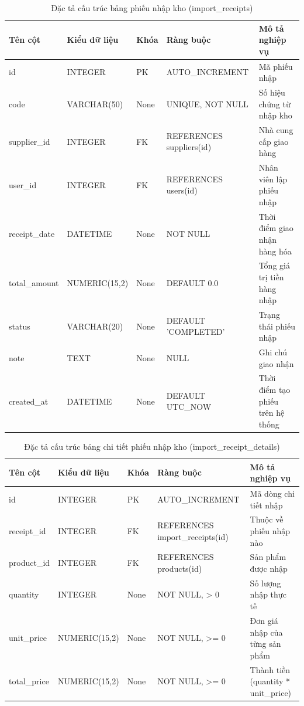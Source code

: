 \begin{table}[h!]
\centering
\caption{Đặc tả cấu trúc bảng phiếu nhập kho (import_receipts)}
\begin{tabular}{|l|l|l|l|l|}
\hline
\rowcolor{tablehead}
\textbf{Tên cột} & \textbf{Kiểu dữ liệu} & \textbf{Khóa} & \textbf{Ràng buộc} & \textbf{Mô tả nghiệp vụ} \\ \hline
id & INTEGER & PK & AUTO\_INCREMENT & Mã phiếu nhập \\ \hline
code & VARCHAR(50) & None & UNIQUE, NOT NULL & Số hiệu chứng từ nhập kho \\ \hline
supplier\_id & INTEGER & FK & REFERENCES suppliers(id) & Nhà cung cấp giao hàng \\ \hline
user\_id & INTEGER & FK & REFERENCES users(id) & Nhân viên lập phiếu nhập \\ \hline
receipt\_date & DATETIME & None & NOT NULL & Thời điểm giao nhận hàng hóa \\ \hline
total\_amount & NUMERIC(15,2) & None & DEFAULT 0.0 & Tổng giá trị tiền hàng nhập \\ \hline
status & VARCHAR(20) & None & DEFAULT 'COMPLETED' & Trạng thái phiếu nhập \\ \hline
note & TEXT & None & NULL & Ghi chú giao nhận \\ \hline
created\_at & DATETIME & None & DEFAULT UTC\_NOW & Thời điểm tạo phiếu trên hệ thống \\ \hline
\end{tabular}
\end{table}

\begin{table}[h!]
\centering
\caption{Đặc tả cấu trúc bảng chi tiết phiếu nhập kho (import_receipt_details)}
\begin{tabular}{|l|l|l|l|l|}
\hline
\rowcolor{tablehead}
\textbf{Tên cột} & \textbf{Kiểu dữ liệu} & \textbf{Khóa} & \textbf{Ràng buộc} & \textbf{Mô tả nghiệp vụ} \\ \hline
id & INTEGER & PK & AUTO\_INCREMENT & Mã dòng chi tiết nhập \\ \hline
receipt\_id & INTEGER & FK & REFERENCES import\_receipts(id) & Thuộc về phiếu nhập nào \\ \hline
product\_id & INTEGER & FK & REFERENCES products(id) & Sản phẩm được nhập \\ \hline
quantity & INTEGER & None & NOT NULL, > 0 & Số lượng nhập thực tế \\ \hline
unit\_price & NUMERIC(15,2) & None & NOT NULL, >= 0 & Đơn giá nhập của từng sản phẩm \\ \hline
total\_price & NUMERIC(15,2) & None & NOT NULL, >= 0 & Thành tiền (quantity * unit\_price) \\ \hline
\end{tabular}
\end{table}

